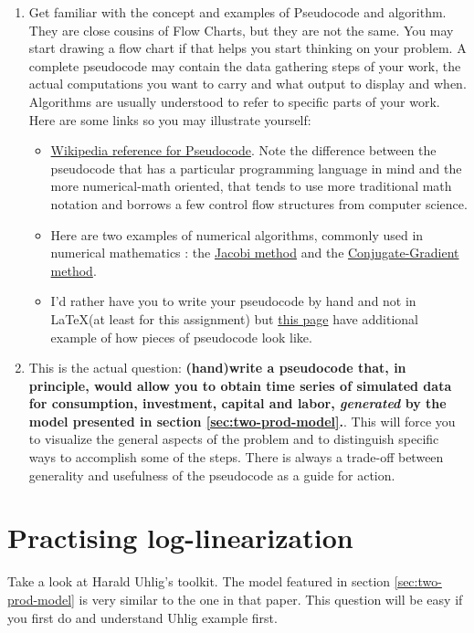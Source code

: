 \documentclass[11pt]{article}
\begin{document}
\begin{enumerate}
\item Get familiar with the concept and examples of Pseudocode and algorithm. They are close cousins of Flow Charts, but they are not the same. You may start drawing a flow chart if that helps you start  thinking on your problem. A complete pseudocode may contain the data gathering steps of your work, the actual computations you want to carry and what output to display and when. Algorithms are usually understood to refer to specific parts of your work. Here are some links so you may illustrate yourself:
     \begin{itemize}
     \item \href{https://es.wikipedia.org/wiki/Pseudoc%C3%B3digo}{ Wikipedia reference for Pseudocode}. Note the difference between the pseudocode that has a particular programming language in mind and the more numerical-math oriented, that tends to use more traditional math notation and borrows a few control flow structures from computer science.
     \item Here are two examples of numerical algorithms, commonly used in numerical mathematics : the \href{https://en.wikipedia.org/wiki/Jacobi_method}{Jacobi method} and the \href{https://en.wikipedia.org/wiki/Conjugate_gradient_method}{Conjugate-Gradient method}.
     \item I'd rather have you to write your pseudocode by hand and not in \LaTeX (at least for this assignment) but \href{https://en.wikibooks.org/wiki/LaTeX/Algorithms_and_Pseudocode}{this page}  have additional example of how pieces of pseudocode look like. 
     \end{itemize}
\item This is the actual question: \textbf{(hand)write a pseudocode that, in principle, would allow you to obtain time series of simulated data for consumption, investment, capital and labor, \emph{generated} by the model presented in section \ref{sec:two-prod-model}.}. This will force you to visualize the general aspects of the problem and to distinguish specific ways to accomplish some of the steps. There is always a trade-off between generality and usefulness of the pseudocode as a guide for action.      
\end{enumerate}

\section{Practising log-linearization}
Take a look at Harald Uhlig's toolkit. The model featured in section \ref{sec:two-prod-model} is very similar to the one in that paper. This question will be easy if you first do and understand Uhlig example first.
\end{document}

